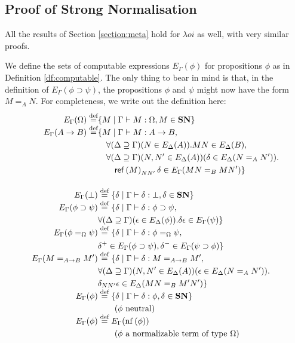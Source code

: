 \subsection{Proof of Strong Normalisation}

All the results of Section \ref{section:meta} hold for $\lambda o i$ as well,
with very similar proofs.

We define the sets of computable expressions $E_\Gamma(\phi)$ for propositions
$\phi$ as in Definition \ref{df:computable}.  The only thing to bear in mind
is that, in the definition of $E_\Gamma(\phi \supset \psi)$, the
propositions $\phi$ and $\psi$ might now have the form $M =_A N$.  For completeness, we write out the definition here:

\begin{align*}
E_\Gamma(\Omega) \mathrel{\smash{\stackrel{\text{def}}{=}}} & \{ M \mid \Gamma \vdash M : \Omega, M \in \mathbf{SN} \} \\
E_\Gamma(A \rightarrow B) \mathrel{\smash{\stackrel{\text{def}}{=}}} & \{ M \mid \Gamma \vdash M : A \rightarrow B, \\
& \quad \forall (\Delta \supseteq \Gamma) (N \in E_\Delta(A)). MN \in E_\Delta(B), \\
& \quad \forall (\Delta \supseteq \Gamma) (N, N' \in E_\Delta(A)) (\delta \in E_\Delta(N =_A N')). \\
& \quad \quad \mathsf{ref} \left( {M} \right)_{N N'} \delta \in E_\Gamma(MN =_B MN') \} \\
\\
E_\Gamma(\bot) & \mathrel{\smash{\stackrel{\text{def}}{=}}} \{ \delta \mid \Gamma \vdash \delta : \bot, \delta \in \mathbf{SN} \} \\
E_\Gamma(\phi \supset \psi) & \mathrel{\smash{\stackrel{\text{def}}{=}}} \{ \delta \mid \Gamma \vdash \delta : \phi \supset \psi, \\
& \forall (\Delta \supseteq \Gamma)(\epsilon \in E_\Delta(\phi)). \delta \epsilon \in E_\Gamma(\psi) \} \\
E_\Gamma(\phi =_\Omega \psi) & \mathrel{\smash{\stackrel{\text{def}}{=}}} \{ \delta \mid \Gamma \vdash \delta : \phi =_\Omega \psi, \\
& \delta^+ \in E_\Gamma(\phi \supset \psi), \delta^- \in E_\Gamma(\psi \supset \phi) \} \\
E_\Gamma(M =_{A \rightarrow B} M') & \mathrel{\smash{\stackrel{\text{def}}{=}}} \{ \delta \mid \Gamma \vdash \delta : M =_{A \rightarrow B} M', \\
& \forall (\Delta \supseteq \Gamma) (N, N' \in E_\Delta(A)) (\epsilon \in E_\Delta(N =_A N')). \\
& \delta_{NN'}\epsilon \in E_\Delta(MN =_B M'N') \} \\
E_\Gamma(\phi) & \mathrel{\smash{\stackrel{\text{def}}{=}}} \{ \delta \mid \Gamma \vdash \delta : \phi, \delta \in \mathbf{SN} \} \\
& \qquad (\phi \text{ neutral}) \\
E_\Gamma(\phi) & \mathrel{\smash{\stackrel{\text{def}}{=}}} E_\Gamma(\mathrm{nf} \left( {\phi} \right)) \\
& \qquad (\phi \mbox{ a normalizable term of type $\Omega$}) \\
\end{align*}


